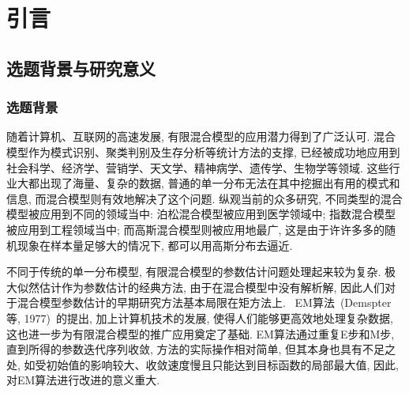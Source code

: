 \documentclass[a4paper,12pt,openany,oneside,utf-8]{ctexbook}
\newcommand{\xiaowuhao}{\fontsize{9pt}{\baselineskip}\selectfont}
\begin{document}
\mainmatter
\fancyfoot[EC,OC]{\hspace*{1 em}\thepage{}\hspace*{1 em}}
\normalsize
{}
\chapter[引言]{引言}\fancyhead[C]{\xiaowuhao} %
\section{选题背景与研究意义}
\subsection{选题背景}


随着计算机、互联网的高速发展, 有限混合模型的应用潜力得到了广泛认可. 混合模型作为模式识别、聚类判别及生存分析等统计方法的支撑, 已经被成功地应用到社会科学、经济学、营销学、天文学、精神病学、遗传学、生物学等领域. 这些行业大都出现了海量、复杂的数据, 普通的单一分布无法在其中挖掘出有用的模式和信息, 而混合模型则有效地解决了这个问题. 纵观当前的众多研究, 不同类型的混合模型被应用到不同的领域当中: 泊松混合模型被应用到医学领域中; 指数混合模型被应用到工程领域当中; 而高斯混合模型则被应用地最广, 这是由于许许多多的随机现象在样本量足够大的情况下, 都可以用高斯分布去逼近.

不同于传统的单一分布模型, 有限混合模型的参数估计问题处理起来较为复杂. 极大似然估计作为参数估计的经典方法, 由于在混合模型中没有解析解, 因此人们对于混合模型参数估计的早期研究方法基本局限在矩方法上.~%
EM算法~(Demspter等, 1977)~的提出, 加上计算机技术的发展, 使得人们能够更高效地处理复杂数据, 这也进一步为有限混合模型的推广应用奠定了基础. EM算法通过重复E步和M步, 直到所得的参数迭代序列收敛, 方法的实际操作相对简单, 但其本身也具有不足之处, 如受初始值的影响较大、收敛速度慢且只能达到目标函数的局部最大值, 因此, 对EM算法进行改进的意义重大.

\end{document}
